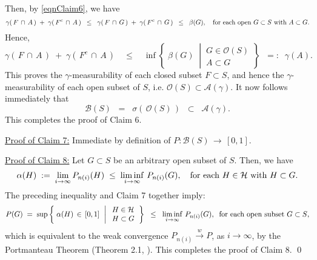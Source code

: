 Then, by \eqref{eqnClaim6}, we have
\begin{equation*}
\gamma(\,F\,\cap\,A\,) \;+\; \gamma(\,F^{c}\,\cap\,A\,)
\;\;\leq\;\; \gamma(\,F\,\cap\,G\,) \;+\; \gamma(\,F^{c}\,\cap\,G\,)
\;\;\leq\;\; \beta(G),
\quad
\textnormal{for each open $G \subset S$ with $A \subset G$}.
\end{equation*}
Hence,
\begin{equation*}
\gamma(\,F\,\cap\,A\,) \;+\; \gamma(\,F^{c}\,\cap\,A\,)
\quad\leq\quad
\inf\left\{\;
\beta(G)
\;\;\left\vert\,
\begin{array}{c} G \in \mathcal{O}(S) \\ A \subset G \end{array}
\right.
\right\}
\;\; =: \;\; \gamma(A).
\end{equation*}
This proves the $\gamma$-measurability of each closed subset $F \subset S$,
and hence the $\gamma$-measurability of each open subset of $S$,
i.e. $\mathcal{O}(S) \subset \mathcal{A}(\gamma)$.
It now follows immediately that
\begin{equation*}
\mathcal{B}(S)
\;\; = \;\; \sigma\!\left(\,\mathcal{O}(S)\,\right)
\;\; \subset \;\; \mathcal{A}(\gamma).
\end{equation*}
This completes the proof of Claim 6.

\vskip 0.5cm
\noindent
\underline{Proof of Claim 7:}\quad
Immediate by definition of $P : \mathcal{B}(S) \,\longrightarrow\, [0,1]$.

\vskip 0.5cm
\noindent
\underline{Proof of Claim 8:}\quad
Let $G \subset S$ be an arbitrary open subset of $S$.
Then, we have
\begin{equation*}
\alpha(H)
\; := \; \lim_{i\rightarrow\infty}P_{n(i)}(H)
\;\leq\; \liminf_{i\rightarrow\infty}\,P_{n(i)}(G),
\quad
\textnormal{for each $H \in \mathcal{H}$ with $H \subset G$}.
\end{equation*}
The preceding inequality and Claim 7 together imply:
\begin{equation*}
P(G)
\; = \;
\sup\left\{\;
\alpha(H) \,\in\, [0,1]
\,\;\left\vert\;
\begin{array}{l} H \in \mathcal{H} \\ H \subset G \end{array}
\right.
\right\}
\;\;\leq\;\;
\liminf_{i\rightarrow\infty}\,P_{n(i)}(G),
\;\;
\textnormal{for each open subset $G \subset S$},
\end{equation*}
which is equivalent to the weak convergence
$P_{n(i)} \overset{w}{\longrightarrow} P$, as $i \longrightarrow \infty$,
by the Portmanteau Theorem (Theorem 2.1, \cite{Billingsley1999}).
This completes the proof of Claim 8.
\qed

\renewcommand{\theenumi}{\roman{enumi}}
\renewcommand{\labelenumi}{\textnormal{(\theenumi)}$\;\;$}

